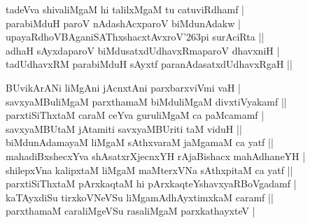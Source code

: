 \begin{entry}
\begin{shl}
\end{shl}
\medskip
{}
\smallskip
{}
\medskip
\begin{shl}
tadeVva shivaliMgaM hi talilxMgaM tu catuviRdhamf |\\[2pt]
parabiMduH paroV nAdashAcxparoV biMdunAdakw |\\[2pt]
upayaRdhoVBAganiSAThxshacxtAvxroV{\char'263}pi surAciRta ||\\[2pt]
adhaH sAyxdaparoV biMdusatxdUdhavxRmaparoV dhavxniH |\\[2pt]
tadUdhavxRM parabiMduH sAyxtf paranAdasatxdUdhavxRgaH ||\\[-1pt]
\end{shl}
\medskip
{}
\smallskip
{}
\medskip
\begin{shl}
BUvikArANi liMgAni jAcnxtAni parxbarxviVmi vaH |\\[2pt]
savxyaMBuliMgaM parxthamaM biMduliMgaM divxtiVyakamf ||\\[2pt]
parxtiSiThxtaM caraM ceYva guruliMgaM ca paMcamamf |\\[2pt]
savxyaMBUtaM jAtamiti savxyaMBUriti taM viduH ||\\[2pt]
biMdunAdamayaM liMgaM sAthxvaraM jaMgamaM ca yatf ||\\[2pt]
mahadiBxshecxYva shAsatxrXjecnxYH rAjaBishacx mahAdhaneYH |\\[2pt]
shilepxVna kalipxtaM liMgaM maMterxVNa sAthxpitaM ca yatf ||\\[2pt]
parxtiSiThxtaM pArxkaqtaM hi pArxkaqteYshavxyaRBoVgadamf |\\[2pt]
kaTAyxdiSu tirxkoVNeVSu liMgamAdhAyxtimxkaM caramf ||\\[2pt]
parxthamaM caraliMgeVSu rasaliMgaM parxkathayxteV |\\[2pt]

\end{shl}
\end{entry}
